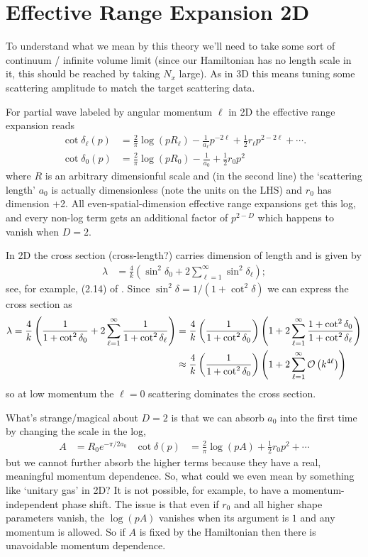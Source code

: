 \section{Effective Range Expansion 2D}

To understand what we mean by this theory we'll need to take some sort of continuum / infinite volume limit (since our Hamiltonian has no length scale in it, this should be reached by taking $N_x$ large).
As in 3D this means tuning some scattering amplitude to match the target scattering data.

For partial wave labeled by angular momentum $\ell$ in 2D the effective range expansion reads
\begin{align}
	\cot \delta_\ell(p)
	&=
			\frac{2}{\pi} \log(p R_\ell)
		-	\frac{1}{a_\ell} p^{-2\ell}
		+	\frac{1}{2} r_\ell p^{2-2\ell}
		+	\cdots.
	\\
	\cot \delta_0(p)
	&=
			\frac{2}{\pi} \log(p R_0)
		-	\frac{1}{a_0}
		+	\frac{1}{2} r_0 p^2
\end{align}
where $R$ is an arbitrary dimensionful scale and (in the second line) the `scattering length' $a_0$ is actually dimensionless (note the units on the LHS) and $r_0$ has dimension +2.
All even-spatial-dimension effective range expansions get this log, and every non-log term gets an additional factor of $p^{2-D}$ which happens to vanish when $D=2$.

In 2D the cross section (cross-length?) carries dimension of length and is given by
\begin{align}
	\lambda &= \frac{4}{k}\left(\sin^2 \delta_0 + 2\sum_{\ell=1}^{\infty} \sin^2 \delta_\ell \right);
\end{align}
see, for example, (2.14) of .
Since $\sin^2 \delta = 1/(1+\cot^2\delta)$ we can express the cross section as
\begin{align}
	\lambda
	=
	\frac{4}{k}\left(\frac{1}{1+\cot^2 \delta_0} + 2\sum_{\ell=1}^{\infty} \frac{1}{1+\cot^2 \delta_\ell} \right)
	&=
	\frac{4}{k}\left(\frac{1}{1+\cot^2 \delta_0}\right) \left(1+ 2\sum_{\ell=1}^{\infty} \frac{1+\cot^2 \delta_0}{1+\cot^2 \delta_\ell} \right)
	\\
	&\approx
	\frac{4}{k}\left(\frac{1}{1+\cot^2 \delta_0}\right) \left(1+ 2\sum_{\ell=1}^{\infty} \mathcal{O}\left(k^{4\ell}\right) \right)
\end{align}
so at low momentum the $\ell=0$ scattering dominates the cross section.

What's strange/magical about $D=2$ is that we can absorb $a_0$ into the first time by changing the scale in the log,
\begin{align}
	A &= R_0 e^{-\pi/2a_0}
	&
	\cot \delta(p)
	&=
			\frac{2}{\pi} \log(p A)
		+	\frac{1}{2} r_0 p^2
		+	\cdots
	\label{eq:no-constant}
\end{align}
but we cannot further absorb the higher terms because they have a real, meaningful momentum dependence.
So, what could we even mean by something like `unitary gas' in 2D?
It is not possible, for example, to have a momentum-independent phase shift.
The issue is that even if $r_0$ and all higher shape parameters vanish, the $\log(pA)$ vanishes when its argument is $1$ and any momentum is allowed.
So if $A$ is fixed by the Hamiltonian then there is unavoidable momentum dependence.

